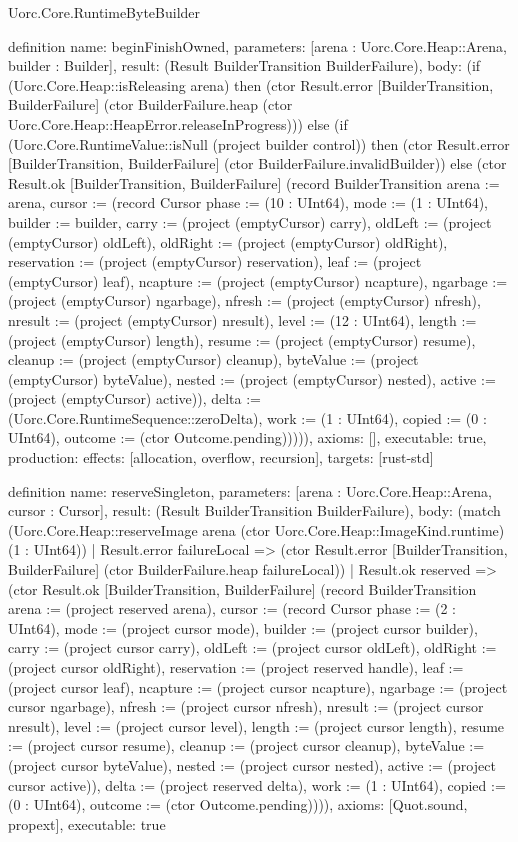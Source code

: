 \begin{lexlean}{Uorc.Core.RuntimeByteBuilder}
\begin{semanticmodule}
definition{
  name: beginFinishOwned,
  parameters: [arena : Uorc.Core.Heap::Arena, builder : Builder],
  result: (Result BuilderTransition BuilderFailure),
  body: (if (Uorc.Core.Heap::isReleasing arena) then (ctor Result.error [BuilderTransition, BuilderFailure] (ctor BuilderFailure.heap (ctor Uorc.Core.Heap::HeapError.releaseInProgress))) else (if (Uorc.Core.RuntimeValue::isNull (project builder control)) then (ctor Result.error [BuilderTransition, BuilderFailure] (ctor BuilderFailure.invalidBuilder)) else (ctor Result.ok [BuilderTransition, BuilderFailure] (record BuilderTransition {arena := arena, cursor := (record Cursor {phase := (10 : UInt64), mode := (1 : UInt64), builder := builder, carry := (project (emptyCursor) carry), oldLeft := (project (emptyCursor) oldLeft), oldRight := (project (emptyCursor) oldRight), reservation := (project (emptyCursor) reservation), leaf := (project (emptyCursor) leaf), ncapture := (project (emptyCursor) ncapture), ngarbage := (project (emptyCursor) ngarbage), nfresh := (project (emptyCursor) nfresh), nresult := (project (emptyCursor) nresult), level := (12 : UInt64), length := (project (emptyCursor) length), resume := (project (emptyCursor) resume), cleanup := (project (emptyCursor) cleanup), byteValue := (project (emptyCursor) byteValue), nested := (project (emptyCursor) nested), active := (project (emptyCursor) active)}), delta := (Uorc.Core.RuntimeSequence::zeroDelta), work := (1 : UInt64), copied := (0 : UInt64), outcome := (ctor Outcome.pending)})))),
  axioms: [],
  executable: true,
  production: {effects: [allocation, overflow, recursion], targets: [rust-std]}
}

definition{
  name: reserveSingleton,
  parameters: [arena : Uorc.Core.Heap::Arena, cursor : Cursor],
  result: (Result BuilderTransition BuilderFailure),
  body: (match (Uorc.Core.Heap::reserveImage arena (ctor Uorc.Core.Heap::ImageKind.runtime) (1 : UInt64))
    | Result.error failureLocal => (ctor Result.error [BuilderTransition, BuilderFailure] (ctor BuilderFailure.heap failureLocal))
    | Result.ok reserved => (ctor Result.ok [BuilderTransition, BuilderFailure] (record BuilderTransition {arena := (project reserved arena), cursor := (record Cursor {phase := (2 : UInt64), mode := (project cursor mode), builder := (project cursor builder), carry := (project cursor carry), oldLeft := (project cursor oldLeft), oldRight := (project cursor oldRight), reservation := (project reserved handle), leaf := (project cursor leaf), ncapture := (project cursor ncapture), ngarbage := (project cursor ngarbage), nfresh := (project cursor nfresh), nresult := (project cursor nresult), level := (project cursor level), length := (project cursor length), resume := (project cursor resume), cleanup := (project cursor cleanup), byteValue := (project cursor byteValue), nested := (project cursor nested), active := (project cursor active)}), delta := (project reserved delta), work := (1 : UInt64), copied := (0 : UInt64), outcome := (ctor Outcome.pending)}))),
  axioms: [Quot.sound, propext],
  executable: true
}


\end{semanticmodule}
\end{lexlean}
